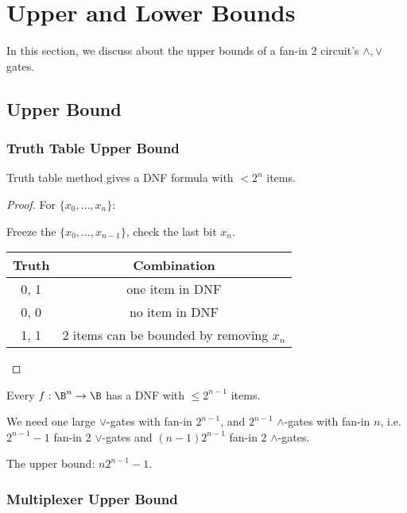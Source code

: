 \section{Upper and Lower Bounds}

In this section, we discuss about the upper bounds of a fan-in 2
circuit's \(\land, \lor\) gates.

\subsection{Upper Bound}

\subsubsection{Truth Table Upper Bound}

\begin{theorem}
Truth table method gives a DNF formula with \(< 2^n\) items.
\end{theorem}

\begin{proof}
For \(\{x_0,\dots, x_n\}\):

Freeze the \(\{x_0,\dots, x_{n-1}\}\), check the last bit \(x_n\).

\begin{table}[ht]
    \centering
    \begin{tabular}{c|c}
    \hline
    Truth & Combination \\\hline
        0, 1 & one item in DNF \\\hline
0, 0 & no item in DNF \\\hline
1, 1 & 2 items can be bounded by removing \(x_{n}\) \\\hline
    \end{tabular}
\end{table}
\end{proof}

\begin{corollary}
Every \(f: \B^n \rightarrow \B\) has a DNF with
\(\le 2^{n-1}\) items.
\end{corollary}

We need one large \(\lor\)-gates with fan-in \(2^{n-1}\), and $2^{n-1}$ \(\land\)-gates with fan-in
  \(n\), i.e. \(2^{n-1}-1\) fan-in 2 \(\lor\)-gates and \((n-1)2^{n-1}\) fan-in 2 \(\land\)-gates.

The upper bound: \(n2^{n-1}-1\).

\subsubsection{Multiplexer Upper Bound}

